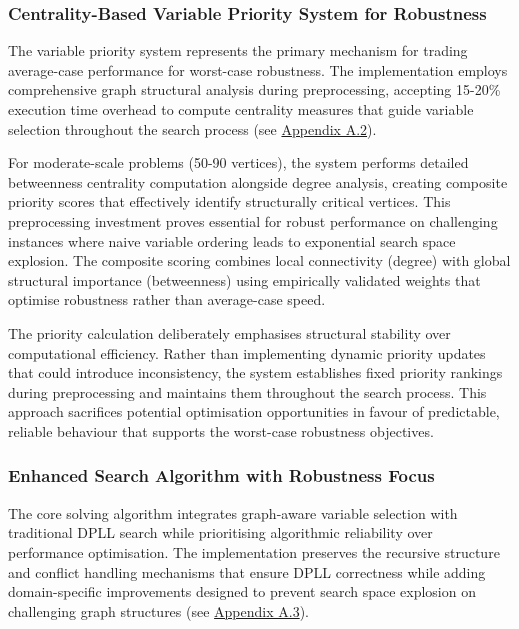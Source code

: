 \subsubsection{Centrality-Based Variable Priority System for Robustness}

The variable priority system represents the primary mechanism for trading average-case performance for worst-case robustness. The implementation employs comprehensive graph structural analysis during preprocessing, accepting 15-20\% execution time overhead to compute centrality measures that guide variable selection throughout the search process (see \hyperref[appendix:centrality-priority]{Appendix A.2}).

For moderate-scale problems (50-90 vertices), the system performs detailed betweenness centrality computation alongside degree analysis, creating composite priority scores that effectively identify structurally critical vertices. This preprocessing investment proves essential for robust performance on challenging instances where naive variable ordering leads to exponential search space explosion. The composite scoring combines local connectivity (degree) with global structural importance (betweenness) using empirically validated weights that optimise robustness rather than average-case speed.

The priority calculation deliberately emphasises structural stability over computational efficiency. Rather than implementing dynamic priority updates that could introduce inconsistency, the system establishes fixed priority rankings during preprocessing and maintains them throughout the search process. This approach sacrifices potential optimisation opportunities in favour of predictable, reliable behaviour that supports the worst-case robustness objectives.

\subsubsection{Enhanced Search Algorithm with Robustness Focus}

The core solving algorithm integrates graph-aware variable selection with traditional DPLL search while prioritising algorithmic reliability over performance optimisation. The implementation preserves the recursive structure and conflict handling mechanisms that ensure DPLL correctness while adding domain-specific improvements designed to prevent search space explosion on challenging graph structures (see \hyperref[appendix:graph-aware-search]{Appendix A.3}).

